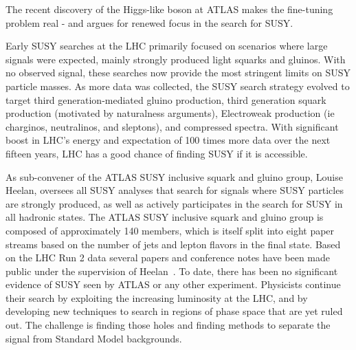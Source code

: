 The recent discovery of the Higgs-like boson at 
ATLAS makes the fine-tuning problem real - and argues for renewed focus 
in the search for SUSY.

Early SUSY searches at the LHC primarily focused on scenarios where
large signals were expected, mainly strongly produced light squarks
and gluinos. With no observed signal, these searches now provide the
most stringent limits on SUSY particle masses. As more data was
collected, the SUSY search strategy evolved to target third
generation-mediated gluino production, third generation squark
production (motivated by naturalness arguments), Electroweak
production (ie charginos, neutralinos, and sleptons), and compressed
spectra. With significant boost in LHC's energy and expectation of 100
times more data over the next fifteen years, LHC has a good chance of
finding SUSY if it is accessible.



As sub-convener of the ATLAS SUSY inclusive squark and gluino group,
Louise Heelan, oversees all SUSY analyses that search for signals
where SUSY particles are strongly produced, as well as actively
participates in the search for SUSY in all hadronic states.  The ATLAS
SUSY inclusive squark and gluino group is composed of approximately
140 members, which is itself split into eight paper streams based on
the number of jets and lepton flavors in the final state.
Based on the LHC Run 2 data several papers and conference notes have been made public under the supervision of Heelan~\cite{Aad:2016jxj,Aaboud:2016zdn,Aad:2016qqk,ATLAS-CONF-2015-082,Aad:2016tuk,Aad:2016eki,Aaboud:2016zpr,ATLASCollaboration:2016wlb,ATLAS-CONF-2016-078,ATLAS-CONF-2016-054,ATLAS-CONF-2016-037,ATLAS-CONF-2016-052,ATLAS-CONF-2016-066,ATLAS-CONF-2016-095}. 
To date, there has been no significant evidence of SUSY seen by ATLAS or any other experiment.
Physicists continue their search by exploiting the increasing luminosity at the LHC, and by developing new techniques to search in regions of phase space that are yet ruled out. 
The challenge is finding those holes and finding methods to separate the signal from Standard Model backgrounds.
